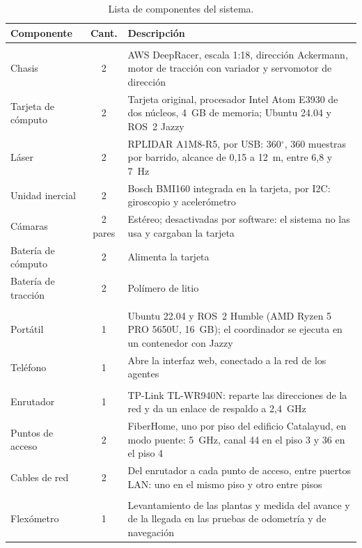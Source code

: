 \begin{table}[H]
  \centering\footnotesize{}
  \caption{Lista de componentes del sistema.}
  \label{tab:vehiculo}
  \begin{tabular}{@{}>{\raggedright\arraybackslash}p{}c>{\raggedright\arraybackslash}p{}@{}}
    \toprule
    \textbf{Componente} & \textbf{Cant.} & \textbf{Descripción} \\ \midrule
    \multicolumn{3}{@{}l}{\textit{Agentes}} \\
    Chasis & 2 & AWS DeepRacer, escala 1:18, dirección Ackermann, motor de tracción con variador y servomotor de dirección \\
    Tarjeta de cómputo & 2 & Tarjeta original, procesador Intel Atom E3930 de dos núcleos, 4~GB de memoria; Ubuntu 24.04 y ROS~2 Jazzy \\
    Láser & 2 & RPLIDAR A1M8-R5, por USB: 360$^\circ$, 360 muestras por barrido, alcance de 0,15 a 12~m, entre 6,8 y 7~Hz \\
    Unidad inercial & 2 & Bosch BMI160 integrada en la tarjeta, por I2C: giroscopio y acelerómetro \\
    Cámaras & 2 pares & Estéreo; desactivadas por software: el sistema no las usa y cargaban la tarjeta \\
    Batería de cómputo & 2 & Alimenta la tarjeta \\
    Batería de tracción & 2 & Polímero de litio \\ \addlinespace
    \multicolumn{3}{@{}l}{\textit{Coordinación e interacción}} \\
    Portátil & 1 & Ubuntu 22.04 y ROS~2 Humble (AMD Ryzen 5 PRO 5650U, 16~GB); el coordinador se ejecuta en un contenedor con Jazzy \\
    Teléfono & 1 & Abre la interfaz web, conectado a la red de los agentes \\ \addlinespace
    \multicolumn{3}{@{}l}{\textit{Red}} \\
    Enrutador & 1 & TP-Link TL-WR940N: reparte las direcciones de la red y da un enlace de respaldo a 2,4~GHz \\
    Puntos de acceso & 2 & FiberHome, uno por piso del edificio Catalayud, en modo puente: 5~GHz, canal 44 en el piso 3 y 36 en el piso 4 \\
    Cables de red & 2 & Del enrutador a cada punto de acceso, entre puertos LAN: uno en el mismo piso y otro entre pisos \\ \addlinespace
    \multicolumn{3}{@{}l}{\textit{Medición}} \\
    Flexómetro & 1 & Levantamiento de las plantas y medida del avance y de la llegada en las pruebas de odometría y de navegación \\ \bottomrule
  \end{tabular}
\end{table}

